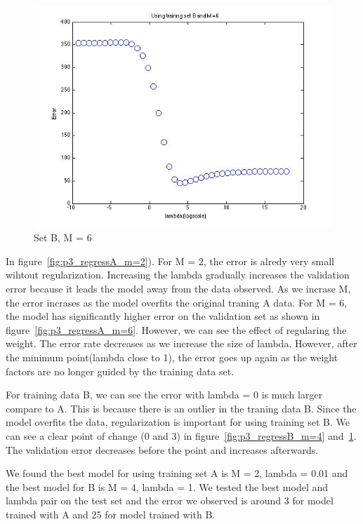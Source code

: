 \begin{figure}[!htb]
  \includegraphics[width=\linewidth]{figures/p3_regressB_m=6}
  \caption{Set B, M = 6}\label{fig:p3_regressB_m=6}
\endminipage
\end{figure}


In figure~\ref{fig:p3_regressA_m=2}). For M = 2, the error is alredy very small wihtout regularization. Increasing the lambda gradually increases the validation error because it leads the model away from the data observed. As we incrase M, the error incrases as the model overfits the original traning A data. For M = 6, the model has significantly higher error on the validation set as shown in figure~\ref{fig:p3_regressA_m=6}.  However, we 
can see the effect of regularing the weight. The error rate decreases as we increase the size of lambda. However, after the minimum point(lambda close to 1), the error goes up again as the weight factors are no longer guided by the training data set. 

For training data B, we can see the error with lambda = 0 is much larger compare to A. This is because there is an outlier in the traning data B. Since the model overfits the data, regularization is important for using training set B. We can see a clear point of change (0 and 3) in figure~\ref{fig:p3_regressB_m=4} and~\ref{fig:p3_regressB_m=6}. The validation error decreases before the point and increases afterwards. 

We found the best model for using training set A is M = 2, lambda = 0.01 and the best model for B is M = 4, lambda = 1. We tested the best model and lambda pair on the test set and the error we observed is around 3 for model trained with A and 25 for model trained with B. 

